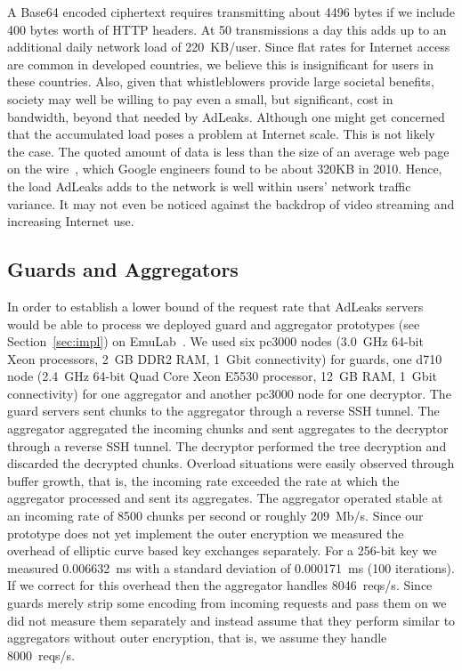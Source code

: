 \documentclass[twocolumn,10pt]{article}
\newcommand{\Keccmean}{0.006632}
\newcommand{\Ueccmean}{ms}
\newcommand{\Keccsdev}{0.000171}
\newcommand{\Ueccsdev}{ms}
\newcommand{\Keccklen}{256}
\newcommand{\Kads}{50}
\newcommand{\Kheaders}{400}
\newcommand{\Ktlen}{4496}
\newcommand{\Kloadinc}{220}
\newcommand{\Uloadinc}{KB/user}
\newcommand{\Kmaxreqi}{8000}
\newcommand{\Umaxreqi}{reqs/s}
\newcommand{\Kmaxreqii}{8500}
\newcommand{\Keccreqii}{8046}
\newcommand{\Ueccreqii}{reqs/s}
\newcommand{\Kmbsii}{209}
\newcommand{\Umbsii}{Mb/s}
\begin{document}
A Base64 encoded ciphertext requires transmitting about \Ktlen{} bytes if we
include \Kheaders{} bytes worth of HTTP headers.  At \Kads{} transmissions a
day this adds up to an additional daily network load of
\Kloadinc~\Uloadinc{}.  Since flat rates for Internet access are common in
developed countries, we believe this is insignificant for users in these
countries.  Also, given that whistleblowers provide large societal benefits,
society may well be willing to pay even a small, but significant, cost in
bandwidth, beyond that needed by AdLeaks.
Although one might get concerned that the accumulated load poses a problem
at Internet scale.  This is not likely the case.  The quoted amount of data
is less than the size of an average web page on the wire~\cite{Google2010},
which Google engineers found to be about 320KB in 2010.  Hence, the load
AdLeaks adds to the network is well within users' network traffic variance.
It may not even be noticed against the backdrop of video streaming and
increasing Internet use.


\subsection{Guards and Aggregators}
\label{sec:lab}

In order to establish a lower bound of the request rate that AdLeaks servers
would be able to process we deployed guard and aggregator prototypes (see
Section~\ref{sec:impl}) on EmuLab~\cite{WhiteLSRGNHBJ2002}.  We used six
pc3000 nodes (3.0~GHz 64-bit Xeon processors, 2~GB DDR2 RAM, 1~Gbit
connectivity) for guards, one d710 node (2.4~GHz 64-bit Quad Core Xeon E5530
processor, 12~GB RAM, 1~Gbit connectivity) for one aggregator and another
pc3000 node for one decryptor.  The guard servers sent chunks to the
aggregator through a reverse SSH tunnel.  The aggregator aggregated the
incoming chunks and sent aggregates to the decryptor through a reverse SSH
tunnel.  The decryptor performed the tree decryption and discarded the
decrypted chunks.  Overload situations were easily observed through buffer
growth, that is, the incoming rate exceeded the rate at which the aggregator
processed and sent its aggregates.  The aggregator operated stable at an
incoming rate of \Kmaxreqii{} chunks per second or roughly \Kmbsii~\Umbsii.
Since our prototype does not yet implement the outer encryption we measured
the overhead of elliptic curve based key exchanges separately.  For a
\Keccklen{}-bit key we measured \Keccmean~\Ueccmean{} with a standard
deviation of \Keccsdev~\Ueccsdev{} (100 iterations).  If we correct for this
overhead then the aggregator handles \Keccreqii~\Ueccreqii.  Since guards
merely strip some encoding from incoming requests and pass them on we did
not measure them separately and instead assume that they perform similar to
aggregators without outer encryption, that is, we assume they handle
\Kmaxreqi~\Umaxreqi{}.
\end{document}
